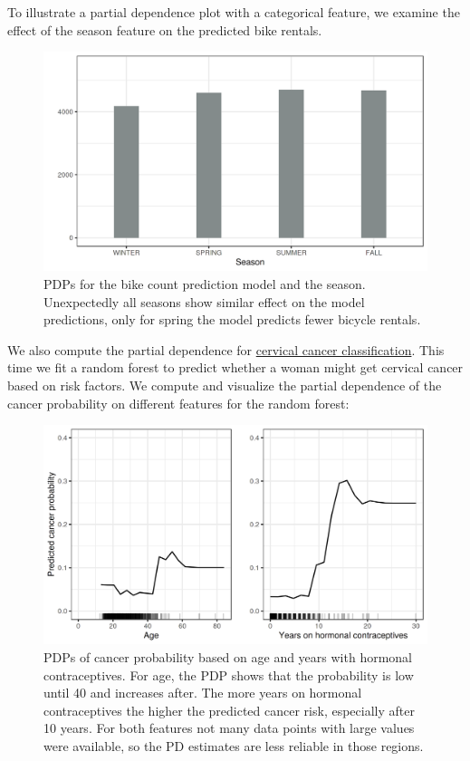\documentclass[12pt,]{krantz}
\begin{document}
To illustrate a partial dependence plot with a categorical feature, we
examine the effect of the season feature on the predicted bike rentals.

\begin{figure}

{\centering \includegraphics[width=\textwidth]{images/pdp-bike-cat-1} 

}

\caption{PDPs for the bike count prediction model and the season. Unexpectedly all seasons show similar effect on the model predictions, only for spring the model predicts fewer bicycle rentals.}\label{fig:pdp-bike-cat}
\end{figure}

We also compute the partial dependence for
\protect\hyperlink{cervical}{cervical cancer classification}. This time
we fit a random forest to predict whether a woman might get cervical
cancer based on risk factors. We compute and visualize the partial
dependence of the cancer probability on different features for the
random forest:

\begin{figure}

{\centering \includegraphics[width=\textwidth]{images/pdp-cervical-1} 

}

\caption{PDPs of cancer probability based on age and years with hormonal contraceptives. For age, the PDP shows that the probability is low until 40 and increases after. The more years on hormonal contraceptives the higher the predicted cancer risk, especially after 10 years. For both features not many data points with large values were available, so the PD estimates are less reliable in those regions.}\label{fig:pdp-cervical}
\end{figure}
\end{document}
